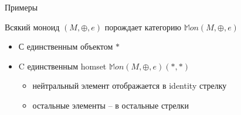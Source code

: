 \documentclass[
  russian,
  aspectratio=169,
  xcolor={svgnames},
  hyperref={colorlinks,citecolor=DeepPink4}]{beamer}
\begin{document}
\begin{frame}[fragile]{Примеры}
\begin{minipage}{0.65\textwidth}
Всякий моноид $(M,\oplus,e)$ порождает категорию
$\mathbb{M}on(M,\oplus,e)$

\begin{itemize}
 \item С единственным объектом $*$
 \item C единственным homset $\mathbb{M}on(M,\oplus,e)(*,*)$
    \begin{itemize}
    \item нейтральный элемент отображается в identity стрелку
    \item остальные элементы -- в остальные стрелки
    \end{itemize}
\end{itemize}
\vspace{1cm}
\end{minipage}
\begin{minipage}{0.3\textwidth}

\end{minipage}



\end{frame}
\end{document}
